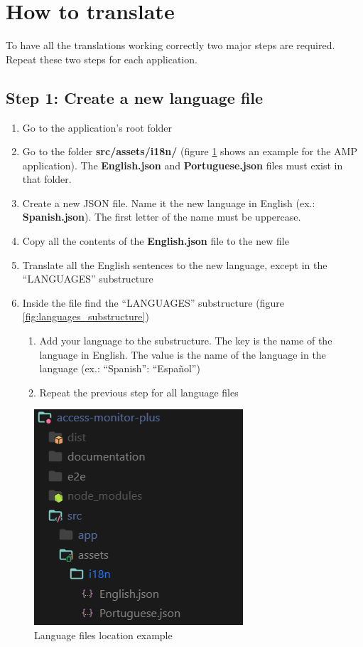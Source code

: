 \section{How to translate}

To have all the translations working correctly two major steps are required. Repeat these two steps for each application.

\subsection{Step 1: Create a new language file}

\begin{enumerate}
    \item Go to the application's root folder
    \item Go to the folder \textbf{src/assets/i18n/} (figure \ref{fig:i18n_folder} shows an example for the AMP application). The \textbf{English.json} and \textbf{Portuguese.json} files must exist in that folder.
    \item Create a new JSON file. Name it the new language in English (ex.: \textbf{Spanish.json}). The first letter of the name must be uppercase.
    \item Copy all the contents of the \textbf{English.json} file to the new file
    \item Translate all the English sentences to the new language, except in the ``LANGUAGES'' substructure
    \item Inside the file find the ``LANGUAGES'' substructure (figure \ref{fig:languages_substructure})
    \begin{enumerate}
        \item Add your language to the substructure. The key is the name of the language in English. The value is the name of the language in the language (ex.: ``Spanish'': ``Español'')
        \item Repeat the previous step for all language files
    \end{enumerate}
\end{enumerate}

\begin{figure}[ht]
    \centering
    \includegraphics{lib/images/translate/i18n_folder.png}
    \caption{Language files location example}
    \label{fig:i18n_folder}
\end{figure}

